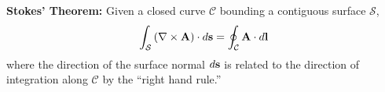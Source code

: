 {\bf Stokes' Theorem:} 
Given a closed curve ${\mathcal C}$ bounding a contiguous surface ${\mathcal S}$,
%
\begin{equation}
\int_{\mathcal S} \left( \nabla \times {\bf A} \right) \cdot d{\bf s} = \oint_{\mathcal C} {\bf A}\cdot d{\bf l}
\end{equation}
%
where the direction of the surface normal $d{\bf s}$ is related to the direction of integration along ${\mathcal C}$ by the ``right hand rule.''

